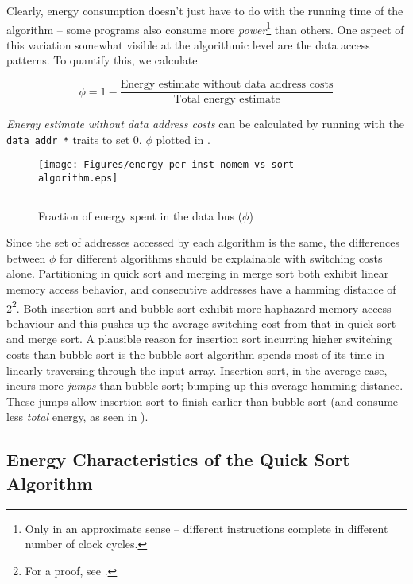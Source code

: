 Clearly, energy consumption doesn't just have to do with the running
time of the algorithm -- some programs also consume more
\textit{power}\footnote{Only in an approximate sense -- different
  instructions complete in different number of clock cycles.} than
others.  One aspect of this variation somewhat visible at the
algorithmic level are the data access patterns.  To quantify this, we
calculate

\begin{equation}
\phi = 1 - \frac{\text{Energy estimate without data address
    costs}}{\text{Total energy estimate}}
\end{equation}

\textit{Energy estimate without data address costs} can be calculated
by running \wattage with the \texttt{data\_addr\_*} traits to set 0.
$\phi$ plotted in .

\begin{figure}[htbp]
  \centering
  \texttt{[image: Figures/energy-per-inst-nomem-vs-sort-algorithm.eps]}
  \rule{35em}{0.5pt}
  \caption{Fraction of energy spent in the data bus ($\phi$)}
  \label{fig:energy-per-inst-nomem-sort-algo}
\end{figure}

Since the set of addresses accessed by each algorithm is the same, the
differences between $\phi$ for different algorithms should be
explainable with switching costs alone.  Partitioning in quick sort
and merging in merge sort both exhibit linear memory access behavior,
and consecutive addresses have a hamming distance of 2\footnote{For a
  proof, see .}.  Both insertion sort
and bubble sort exhibit more haphazard memory access behaviour and
this pushes up the average switching cost from that in quick sort and
merge sort.  A plausible reason for insertion sort incurring higher
switching costs than bubble sort is the bubble sort algorithm spends
most of its time in linearly traversing through the input array.
Insertion sort, in the average case, incurs more \textit{jumps} than
bubble sort; bumping up this average hamming distance.  These jumps
allow insertion sort to finish earlier than bubble-sort (and consume
less \textit{total} energy, as seen in
).

\subsection{Energy Characteristics of the Quick Sort Algorithm}

